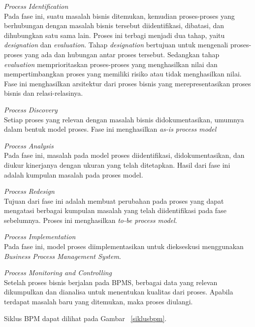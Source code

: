 \begin{description}
	\item{\textit{Process Identification}} \hfill \\ Pada fase ini, suatu masalah bisnis ditemukan, kemudian proses-proses yang berhubungan dengan masalah bisnis tersebut diidentifikasi, dibatasi, dan dihubungkan satu sama lain. Proses ini terbagi menjadi dua tahap, yaitu \textit{designation} dan \textit{evaluation}. Tahap \textit{designation} bertujuan untuk mengenali proses-proses yang ada dan hubungan antar proses tersebut. Sedangkan tahap \textit{evaluation} memprioritaskan proses-proses yang menghasilkan nilai dan mempertimbangkan proses yang memiliki risiko atau tidak menghasilkan nilai. Fase ini menghasilkan arsitektur dari proses bisnis yang merepresentasikan proses bisnis dan relasi-relasinya.   
	\item{\textit{Process Discovery}} \hfill \\ Setiap proses yang relevan dengan masalah bisnis didokumentasikan, umumnya dalam bentuk model proses. Fase ini menghasilkan \textit{as-is process model}
	\item{\textit{Process Analysis}} \hfill \\ Pada fase ini, masalah pada model proses diidentifikasi, didokumentasikan, dan diukur kinerjanya dengan ukuran yang telah ditetapkan. Hasil dari fase ini adalah kumpulan masalah pada proses model.
	\item{\textit{Process Redesign}} \hfill \\ Tujuan dari fase ini adalah membuat perubahan pada proses yang dapat mengatasi berbagai kumpulan masalah yang telah diidentifikasi pada fase sebelumnya. Proses ini menghasilkan \textit{to-be process model}.
	\item{\textit{Process Implementation}} \hfill \\ Pada fase ini, model proses diimplementasikan untuk diekseskusi menggunakan \textit{Business Process Management System}.
	\item{\textit{Process Monitoring and Controlling}} \hfill \\ Setelah proses bisnis berjalan pada BPMS, berbagai data yang relevan dikumpulkan dan dianalisa untuk menentukan kualitas dari proses. Apabila terdapat masalah baru yang ditemukan, maka proses diulangi.
\end{description}
Siklus BPM dapat dilihat pada Gambar ~\ref{siklusbpm}.
